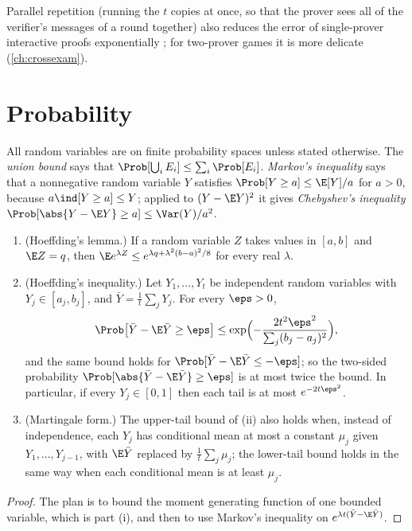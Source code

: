 \begin{refsection}
Parallel repetition (running the $t$ copies at once, so that the prover sees all of the verifier's messages of a round together) also reduces the error of single-prover interactive proofs exponentially \parencite{Goldreich2008}; for two-prover games it is more delicate (\cref{ch:crossexam}).

\section{Probability}\label{sec:toolkit:probability}

All random variables are on finite probability spaces unless stated otherwise. The \emph{union bound} says that $\Prob[\bigcup_iE_i]\le\sum_i\Prob[E_i]$. \emph{Markov's inequality} says that a nonnegative random variable $Y$ satisfies $\Prob[Y\ge a]\le\E[Y]/a$ for $a>0$, because $a\ind[Y\ge a]\le Y$; applied to $(Y-\E Y)^2$ it gives \emph{Chebyshev's inequality} $\Prob[\abs{Y-\E Y}\ge a]\le\Var(Y)/a^2$.

\begin{theorem}[Hoeffding]\label{thm:toolkit:chernoff}
\begin{enumerate}
\item (Hoeffding's lemma.) If a random variable $Z$ takes values in $[a,b]$ and $\E Z=q$, then $\E e^{\lambda Z}\le e^{\lambda q+\lambda^2(b-a)^2/8}$ for every real $\lambda$.
\item (Hoeffding's inequality.) Let $Y_1,\dots,Y_t$ be independent random variables with $Y_j\in[a_j,b_j]$, and $\bar Y=\frac1t\sum_jY_j$. For every $\eps>0$,
\[
\Prob\bigl[\bar Y-\E\bar Y\ge\eps\bigr]\le\exp\Bigl(-\frac{2t^2\eps^2}{\sum_j(b_j-a_j)^2}\Bigr),
\]
and the same bound holds for $\Prob[\bar Y-\E\bar Y\le-\eps]$; so the two-sided probability $\Prob[\abs{\bar Y-\E\bar Y}\ge\eps]$ is at most twice the bound. In particular, if every $Y_j\in[0,1]$ then each tail is at most $e^{-2t\eps^2}$.
\item (Martingale form.) The upper-tail bound of (ii) also holds when, instead of independence, each $Y_j$ has conditional mean at most a constant $\mu_j$ given $Y_1,\dots,Y_{j-1}$, with $\E\bar Y$ replaced by $\frac1t\sum_j\mu_j$; the lower-tail bound holds in the same way when each conditional mean is at least $\mu_j$.
\end{enumerate}
\end{theorem}

\begin{proof}
The plan is to bound the moment generating function of one bounded variable, which is part (i), and then to use Markov's inequality on $e^{\lambda t(\bar Y-\E\bar Y)}$.


\end{proof}
\end{refsection}
